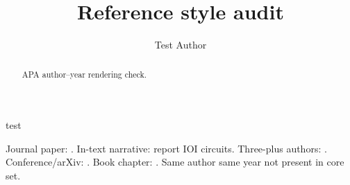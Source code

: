\documentclass[preprint,12pt,authoryear]{elsarticle}
\begin{document}
\begin{frontmatter}
\title{Reference style audit}
\author{Test Author}
\begin{abstract}APA author--year rendering check.\end{abstract}
\begin{keyword}test\end{keyword}
\end{frontmatter}
Journal paper: \citep{mcgrath2023hydra}.
In-text narrative: \citet{wang2023ioi} report IOI circuits.
Three-plus authors: \citet{elhage2021mathematical}.
Conference/arXiv: \citep{gong2026coax}.
Book chapter: \citep{owen1977values}.
Same author same year not present in core set.


\end{document}
